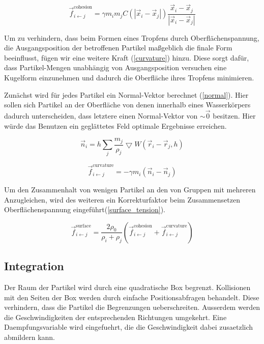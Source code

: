 \documentclass[a4paper]{paper}
\begin{document}
\begin{equation}
\label{cohesion}
\vec{f}_{i\leftarrow j}^{\text{cohesion}} = \gamma m_{i} m_{j} C(|\vec{x}_i - \vec{x}_j|)\frac{\vec{x}_i - \vec{x}_j}{|\vec{x}_i - \vec{x}_j|}
\end{equation}


Um zu verhindern, dass beim Formen eines Tropfens durch Oberflächenspannung, die Ausgangsposition der betroffenen Partikel maßgeblich die finale Form beeinflusst, fügen wir eine weitere Kraft (\ref{curvature}) hinzu.
Diese sorgt dafür, dass Partikel-Mengen unabhängig von Ausgangsposition versuchen eine Kugelform einzunehmen und dadurch die Oberfläche ihres Tropfens minimieren.

Zunächst wird für jedes Partikel ein Normal-Vektor berechnet (\ref{normal}). Hier sollen sich Partikel an der Oberfläche von denen innerhalb eines Wasserkörpers dadurch unterscheiden, dass letztere einen Normal-Vektor von $\sim \vec{0}$ besitzen. Hier würde das Benutzen ein geglättetes Feld optimale Ergebnisse erreichen.

\begin{equation}
\label{normal}
\vec{n}_{i} = h\sum_{j}\frac{m_{j}}{\rho_{j}}\bigtriangledown W (\vec{r}_{i}-\vec{r}_{j},h)
\end{equation}

\begin{equation}
\label{curvature}
\vec{f}_{i\leftarrow j}^{\text{curvature}} = -\gamma m_{i}(\vec{n}_i - \vec{n}_j)
\end{equation}

Um den Zusammenhalt von wenigen Partikel an den von Gruppen mit mehreren Anzugleichen, wird des weiteren ein Korrekturfaktor beim Zusammensetzen Oberflächenspannung eingeführt(\ref{surface_tension}).

\begin{equation}
	\label{surface_tension}
	\vec{f}_{i\leftarrow j}^{\text{surface}} = \frac{2\rho_{0}}{\rho_{i}+\rho_{j}} (\vec{f}_{i\leftarrow j}^{\text{cohesion}} + \vec{f}_{i\leftarrow j}^{\text{curvature}})
\end{equation}


\subsection{Integration}

Der Raum der Partikel wird durch eine quadratische Box begrenzt. Kollisionen mit den Seiten der Box werden durch einfache Positionsabfragen behandelt. Diese verhindern, dass die Partikel die Begrenzungen ueberschreiten. Ausserdem werden die Geschwindigkeiten der entsprechenden Richtungen umgekehrt. Eine Daempfungsvariable wird eingefuehrt, die die Geschwindigkeit dabei zusaetzlich abmildern kann.
\end{document}
